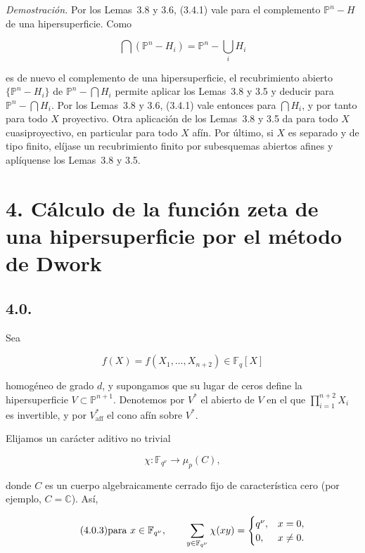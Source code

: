 \pageoriginale

\medskip
\noindent\emph{Demostración.}
Por los Lemas~3.8 y 3.6, (3.4.1) vale para el complemento
$\mathbb P^n-H$ de una hipersuperficie. Como

\[
\bigcap(\mathbb P^n-H_i)=\mathbb P^n-\bigcup_iH_i
\]

es de nuevo el complemento de una hipersuperficie, el recubrimiento
abierto $\{\mathbb P^n-H_i\}$ de $\mathbb P^n-\bigcap H_i$ permite
aplicar los Lemas~3.8 y 3.5 y deducir  para
$\mathbb P^n-\bigcap H_i$. Por los Lemas~3.8 y 3.6, (3.4.1) vale entonces
para $\bigcap H_i$, y por tanto para todo $X$ proyectivo. Otra aplicación
de los Lemas~3.8 y 3.5 da  para todo $X$ cuasiproyectivo, en
particular para todo $X$ afín. Por último, si $X$ es separado y de tipo
finito, elíjase un recubrimiento finito por subesquemas abiertos afines y
aplíquense los Lemas~3.8 y 3.5.

\section*[4. Función zeta: método de Dwork]{4. Cálculo de la función zeta de una hipersuperficie por el
método de Dwork}

\subsection*{4.0.}
Sea

\begin{equation}\tag{4.0.1}
f(X)=f(X_1,\ldots,X_{n+2})\in\mathbb F_q[X]
\end{equation}

homogéneo de grado $d$, y supongamos que su lugar de ceros define la
hipersuperficie $V\subset\mathbb P^{n+1}$. Denotemos por $V^*$ el abierto
de $V$ en el que $\prod_{i=1}^{n+2}X_i$ es invertible, y por
$V^*_{\mathrm{aff}}$ el cono afín sobre $V^*$.

Elijamos un carácter aditivo no trivial

\begin{equation}\tag{4.0.2}
\chi:\mathbb F_{q^\nu}\longrightarrow\mu_p(C),
\end{equation}

donde $C$ es un cuerpo algebraicamente cerrado fijo de característica cero
(por ejemplo, $C=\mathbb C$). Así,

\begin{equation}\tag{4.0.3}
\text{para }x\in\mathbb F_{q^\nu},\qquad
\sum_{y\in\mathbb F_{q^\nu}}\chi(xy)=
\begin{cases}
q^\nu,&x=0,\\
0,&x\ne0.
\end{cases}
\end{equation}

